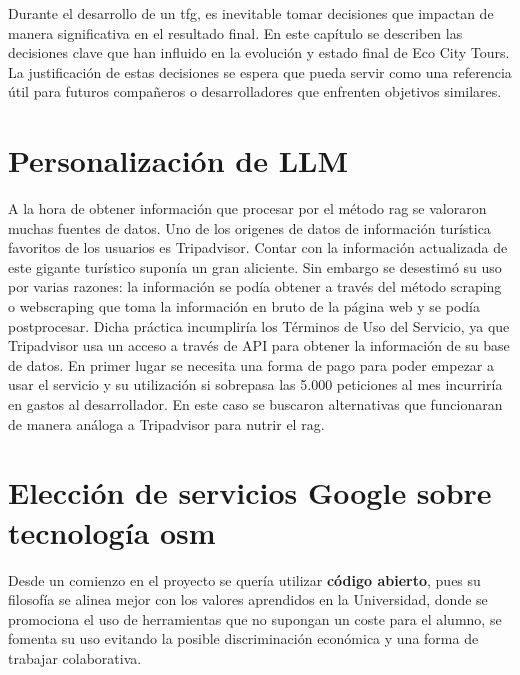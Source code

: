
Durante el desarrollo de un \acrlong{tfg}, es inevitable tomar decisiones que impactan de manera significativa en el resultado final. En este capítulo se describen las decisiones clave que han influido en la evolución y estado final de Eco City Tours. La justificación de estas decisiones se espera que pueda servir como una referencia útil para futuros compañeros o desarrolladores que enfrenten objetivos similares. 

\section{Personalización de LLM}
A la hora de obtener información que procesar por el método \acrshort{rag} se valoraron muchas fuentes de datos. Uno de los origenes de datos de información turística favoritos de los usuarios es Tripadvisor. Contar con la información actualizada de este gigante turístico suponía un gran aliciente. Sin embargo se desestimó su uso por varias razones: la información se podía obtener a través del método scraping o webscraping que toma la información en bruto de la página web y se podía postprocesar. Dicha práctica incumpliría los Términos de Uso del Servicio, ya que Tripadvisor usa un acceso a través de API para obtener la información de su base de datos. En primer lugar se necesita una forma de pago para poder empezar a usar el servicio y su utilización si sobrepasa las 5.000 peticiones al mes incurriría en gastos al desarrollador. En este caso se buscaron alternativas que funcionaran de manera análoga a Tripadvisor para nutrir el \acrshort{rag}. 

\section{Elección de servicios Google sobre tecnología \acrlong{osm}}

Desde un comienzo en el proyecto se quería utilizar \textbf{código abierto}, pues su filosofía se alinea mejor con los valores aprendidos en la Universidad, donde se promociona el uso de herramientas que no supongan un coste para el alumno, se fomenta su uso evitando la posible discriminación económica y una forma de trabajar colaborativa.

